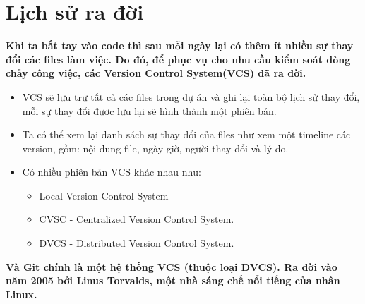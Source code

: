 \documentclass[a4paper]{article}
\begin{document}
	\newpage
	\tableofcontents
	\newpage
	
	\section{Lịch sử ra đời}
	\textbf{Khi ta bắt tay vào code thì sau mỗi ngày lại có thêm ít nhiều sự thay đổi các files làm việc. Do đó, để phục vụ cho nhu cầu kiểm soát dòng chảy công việc, các Version Control System(VCS) đã ra đời.}
	\\
	\begin{itemize}
		\item VCS sẽ lưu trữ tất cả các files trong dự án và ghi lại toàn bộ lịch sử thay đổi, mỗi sự thay đổi đươc lưu lại sẽ hình thành một phiên bản.
		\item Ta có thể xem lại danh sách sự thay đổi của files như xem một timeline các version, gồm: nội dung file, ngày giờ, người thay đổi và lý do.
		\item Có nhiều phiên bản VCS khác nhau như:
		\begin{itemize}
			\item Local Version Control System
			\item CVSC - Centralized Version Control System.
			\item DVCS - Distributed Version Control System.
		\end{itemize}
	\end{itemize}
	\textbf{Và Git chính là một hệ thống VCS (thuộc loại DVCS). Ra đời vào năm 2005 bởi Linus Torvalds, một nhà sáng chế nổi tiếng của nhân Linux.}

	\newpage
\end{document}
